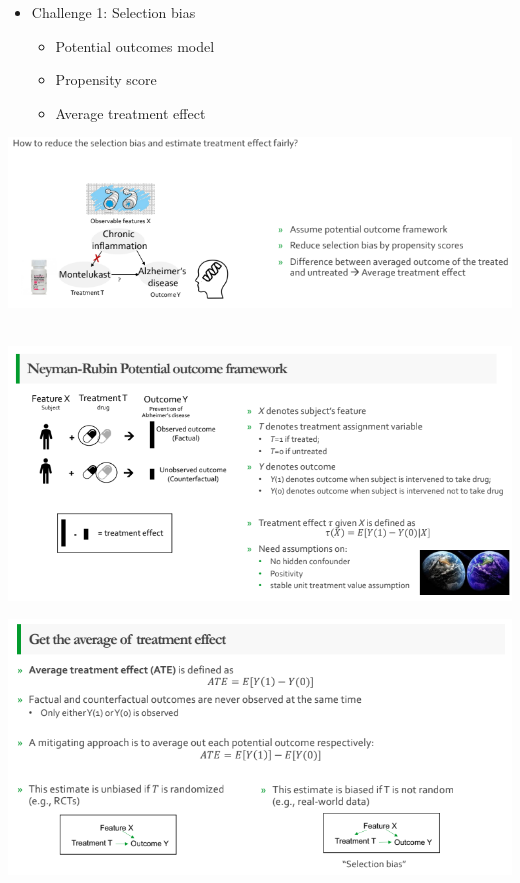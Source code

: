\documentclass[
]{book}
\providecommand{\tightlist}{%
  \setlength{\itemsep}{0pt}\setlength{\parskip}{0pt}}
\theoremstyle{definition}
\theoremstyle{definition}
\theoremstyle{definition}
\theoremstyle{definition}
\theoremstyle{remark}
\begin{document}
\begin{itemize}
\tightlist
\item
  Challenge 1: Selection bias

  \begin{itemize}
  \tightlist
  \item
    Potential outcomes model
  \item
    Propensity score
  \item
    Average treatment effect
  \end{itemize}
\end{itemize}

\includegraphics{figures/07.png}

\strut \\

\includegraphics{figures/08.png}

\includegraphics{figures/09.png}
\end{document}
